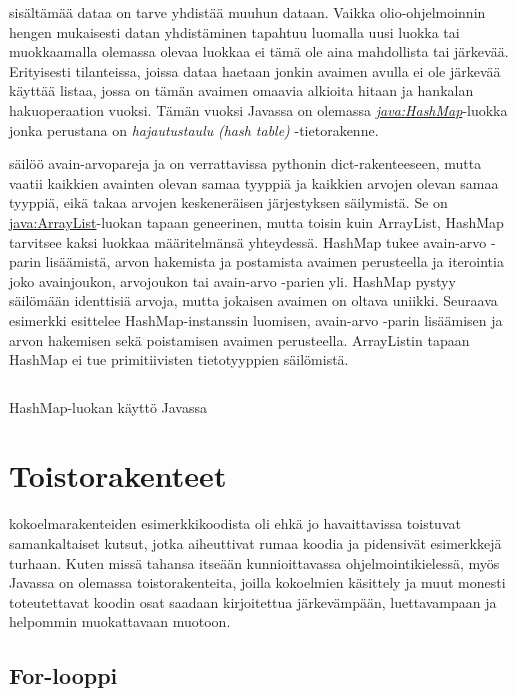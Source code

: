 \documentclass{tufte-book}
\newcommand{\eng}[1]{\textit{(#1)}}
\newcommand{\new}[1]{\textit{\gls{#1}}}
\newcommand{\neweng}[2]{\new{#1} \eng{#2}}
\newcommand{\java}[1]{\underline{\gls{java:#1}}}
\newcommand{\newjava}[1]{\textit{\java{#1}}}
\newcommand{\code}[3]{
\begin{listing}
    \inputminted{java}{OhjelmointiopasEsimerkit/src/#1/#2.java}
    \caption{#3}
    \label{Java-#1-#2}
\end{listing}
}
\begin{document}
 sisältämää dataa on tarve yhdistää muuhun dataan. Vaikka
olio-ohjelmoinnin hengen mukaisesti datan yhdistäminen tapahtuu luomalla uusi luokka tai
muokkaamalla olemassa olevaa luokkaa ei tämä ole aina mahdollista tai järkevää. Erityisesti
tilanteissa, joissa dataa haetaan jonkin avaimen avulla ei ole järkevää käyttää listaa, jossa on
tämän avaimen omaavia alkioita hitaan ja hankalan hakuoperaation vuoksi. Tämän vuoksi Javassa
on olemassa \newjava{HashMap}-luokka jonka perustana on \neweng{hajautustaulu}{hash table}
-tietorakenne.

\newthought{\java{HashMap}-luokka} säilöö avain-arvopareja ja on verrattavissa pythonin
dict-rakenteeseen, mutta vaatii kaikkien avainten olevan samaa tyyppiä ja kaikkien arvojen olevan
samaa tyyppiä, eikä takaa arvojen keskeneräisen järjestyksen säilymistä. Se on 
\java{ArrayList}-luokan tapaan geneerinen, mutta toisin kuin ArrayList, HashMap tarvitsee kaksi
luokkaa määritelmänsä yhteydessä. HashMap tukee avain-arvo -parin lisäämistä, arvon hakemista ja
postamista avaimen perusteella ja iterointia joko avainjoukon, arvojoukon tai avain-arvo -parien
yli. HashMap pystyy säilömään identtisiä arvoja, mutta jokaisen avaimen on oltava uniikki.
Seuraava esimerkki esittelee HashMap-instanssin luomisen, avain-arvo -parin lisäämisen ja
arvon hakemisen sekä poistamisen avaimen perusteella. ArrayListin tapaan HashMap ei tue
primitiivisten tietotyyppien säilömistä.

\code{week3}{BasicHashMap}{HashMap-luokan käyttö Javassa}


\section{Toistorakenteet}
\label{loopeista}

 kokoelmarakenteiden esimerkkikoodista oli ehkä jo havaittavissa
toistuvat samankaltaiset kutsut, jotka aiheuttivat rumaa koodia ja pidensivät esimerkkejä turhaan.
Kuten missä tahansa itseään kunnioittavassa ohjelmointikielessä, myös Javassa on olemassa
toistorakenteita, joilla kokoelmien käsittely ja muut monesti toteutettavat koodin osat saadaan
kirjoitettua järkevämpään, luettavampaan ja helpommin muokattavaan muotoon.

\subsection{For-looppi}
\label{for}
\end{document}
